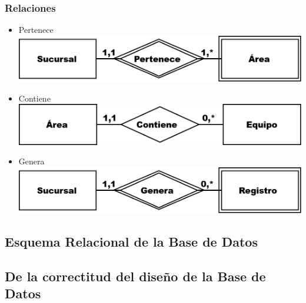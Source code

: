 \documentclass{article}
\begin{document}
\subsubsection{Relaciones}
\begin{itemize}
\item Pertenece
\includegraphics[scale=0.25]{Imagenes/Informe1/RelacionPertenece.png}
\item Contiene
\includegraphics[scale=0.25]{Imagenes/Informe1/RelacionContiene.png}
\item Genera
\includegraphics[scale=0.25]{Imagenes/Informe1/RelacionGenera.png}
\end{itemize}

\subsection{Esquema Relacional de la Base de Datos}

\subsection{De la correctitud del diseño de la Base de Datos}
\end{document}
